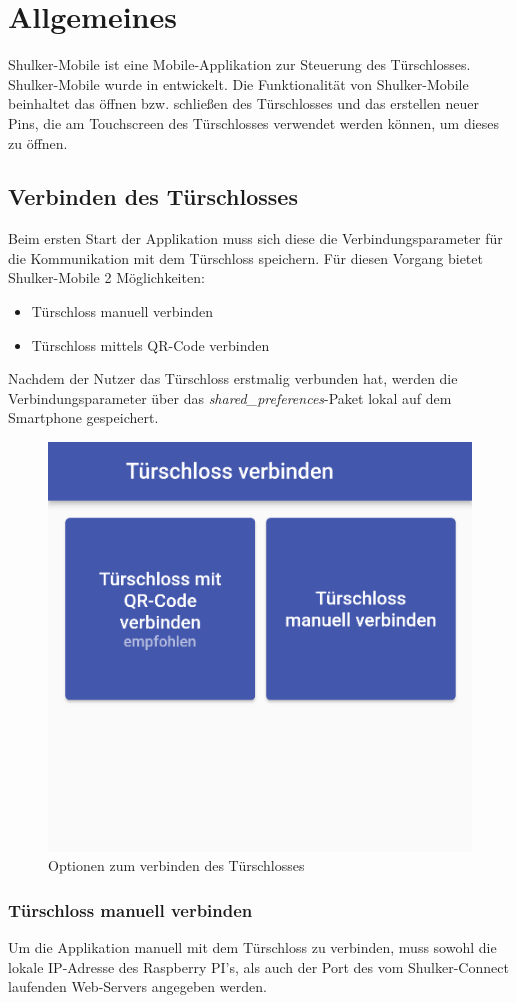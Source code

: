 \chapter{Allgemeines}
Shulker-Mobile ist eine Mobile-Applikation zur Steuerung des Türschlosses.
Shulker-Mobile wurde in  entwickelt.
Die Funktionalität von Shulker-Mobile beinhaltet das öffnen bzw. schließen des Türschlosses und das
erstellen neuer Pins, die am Touchscreen des Türschlosses verwendet werden können, um dieses zu öffnen.

\section{Verbinden des Türschlosses}
Beim ersten Start der Applikation muss sich diese die Verbindungsparameter für die Kommunikation mit dem Türschloss speichern.
Für diesen Vorgang bietet Shulker-Mobile 2 Möglichkeiten:
\begin{itemize}
    \item Türschloss manuell verbinden
    \item Türschloss mittels QR-Code verbinden
\end{itemize}
Nachdem der Nutzer das Türschloss erstmalig verbunden hat, werden die Verbindungsparameter über das 
\textit{shared\_preferences}-Paket lokal auf dem Smartphone gespeichert. 

\begin{figure}[H]
    \begin{center}
        \includegraphics[width=.5\textwidth]{images/mobile/ConnectLockOptions.png}
        \caption{Optionen zum verbinden des Türschlosses}
    \end{center}
\end{figure}

\subsection{Türschloss manuell verbinden}
Um die Applikation manuell mit dem Türschloss zu verbinden, muss sowohl die lokale IP-Adresse des Raspberry PI's, als
auch der Port des vom Shulker-Connect laufenden Web-Servers angegeben werden.

